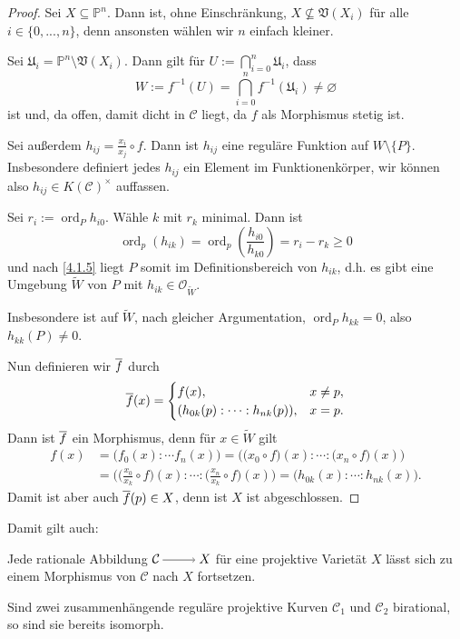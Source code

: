 \documentclass[a4paper,12pt,index=toc]{scrbook}
\theoremstyle{keinenummern} %
\def\CC{\mathcal{C}}
\def\V{\mathfrak{V}}
\def\O{\mathcal{O}}
\def\P{\mathbb{P}}
\def\U{\mathfrak{U}}
\newcommand{\ord}{\operatorname{ord}}
\newcommand{\leer}{\ensuremath{\varnothing}}
\renewcommand{\dotsc}{\ensuremath{\!...}}
\newcommand{\schlange}[1]{\widetilde{#1}}
\def\Bar#1{\ensuremath\overline{#1}}
\begin{document}
\begin{proof}
Sei $X\subseteq\P^{n}$. Dann ist, ohne Einschränkung, $X\not\subseteq\V(X_{i})$ für alle $i\in\{0,\dotsc,n\}$, denn ansonsten wählen wir $n$ einfach kleiner.

Sei $\U_{i}=\P^{n}\setminus\V(X_{i})$. Dann gilt für $\displaystyle U:=\bigcap_{i=0}^{n}\U_{i}$, dass
\[W:=f^{-1}(U)=\bigcap_{i=0}^{n}f^{-1}(\U_{i})\neq\leer\]
ist und, da offen, damit dicht in $\CC$ liegt, da $f$ als Morphismus stetig ist.

Sei außerdem $h_{ij}=\frac{x_{i}}{x_{j}}\circ f$. Dann ist $h_{ij}$ eine reguläre Funktion auf $W\setminus\{P\}$. Insbesondere definiert jedes $h_{ij}$ ein Element im Funktionenkörper, wir können also $h_{ij}\in K(\CC)^{\times}$ auffassen.

Sei $r_{i}:=\ord_{P}h_{i0}$. Wähle $k$ mit $r_{k}$ minimal. Dann ist
\[\ord_{p}(h_{ik})=\ord_{p}\left(\frac{h_{i0}}{h_{k0}}\right)=r_{i}-r_{k}\geq 0\]
und nach \cref{4.1.5} liegt $P$ somit im Definitionsbereich von $h_{ik}$, d.h. es gibt eine Umgebung $\schlange{W}$ von $P$ mit $h_{ik}\in\O_{\schlange{W}}$.

Insbesondere ist auf $\schlange{W}$, nach gleicher Argumentation, $\ord_{P}h_{kk}=0$, also $h_{kk}(P)\neq 0$.

Nun definieren wir $\Bar{f}$ durch
\[\Bar{f}(x)=\begin{cases}f(x),&x\neq p,\\(h_{0k}(p):\dotsm:h_{nk}(p)),&x=p.\end{cases}\]
Dann ist $\Bar{f}$ ein Morphismus, denn für $x\in\schlange{W}$ gilt
\begin{align*}
f(x)&=\bigl(f_{0}(x):\dotsm f_{n}(x)\bigr)=\bigl(\bigl(x_{0}\circ f\bigr)(x):\dotsm:\bigl(x_{n}\circ f\bigr)(x)\bigr)\\
&=\bigl(\bigl(\tfrac{x_{0}}{x_{k}}\circ f\bigr)(x):\dotsm:\bigl(\tfrac{x_{n}}{x_{k}}\circ f\bigr)(x)\bigr)=\bigl(h_{0k}(x):\dotsm:h_{nk}(x)\bigr).
\end{align*}
Damit ist aber auch $\Bar{f}(p)\in X$, denn ist $X$ ist abgeschlossen.
\end{proof}

Damit gilt auch:
\begin{kor}\label{4.1.7}
Jede rationale Abbildung $\CC\ra X$ für eine projektive Varietät $X$ lässt sich zu einem Morphismus von $\CC$ nach $X$ fortsetzen.
\end{kor}

\begin{kor}\label{4.1.8}
Sind zwei zusammenhängende reguläre projektive Kurven $\CC_{1}$ und $\CC_{2}$ birational, so sind sie bereits isomorph.
\end{kor}
\end{document}
